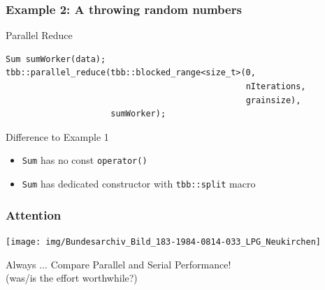 \documentclass[9pt,pdftex]{beamer}
\begin{document}
\begin{frame}[fragile]
  \frametitle{Example 2: A throwing random numbers}
  
   \begin{block}{Parallel Reduce}
     \small
     \begin{lstlisting}[]
Sum sumWorker(data);
tbb::parallel_reduce(tbb::blocked_range<size_t>(0,
                                                nIterations,
                                                grainsize),
                     sumWorker);
     \end{lstlisting}
   \end{block}

   \begin{block}{Difference to Example 1}
     \begin{itemize}
     \item \texttt{Sum} has no const \texttt{operator()}
     \item \texttt{Sum} has dedicated constructor with \texttt{tbb::split} macro
     \end{itemize}
   \end{block}
\end{frame}

\begin{frame}
  \frametitle{Attention}
  \vfill
  \begin{center}
    \texttt{[image: img/Bundesarchiv\_Bild\_183-1984-0814-033\_LPG\_Neukirchen]}\cite{Wikicommons}
    \begin{alertblock}{Always ...}
      Compare Parallel and Serial Performance!\\
      (was/is the effort worthwhile?)
    \end{alertblock}
  \end{center}

  \vfill
\end{frame}
\end{document}
